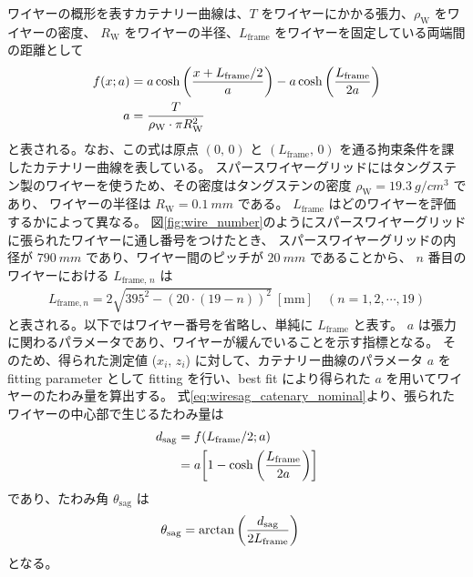 \documentclass[../../main.tex]{subfiles}
\begin{document}
ワイヤーの概形を表すカテナリー曲線は、$T$ をワイヤーにかかる張力、$\rho_{\mathrm{W}}$ をワイヤーの密度、
$R_{\mathrm{W}}$ をワイヤーの半径、$L_{\mathrm{frame}}$ をワイヤーを固定している両端間の距離として
\begin{align}
    \label{eq:wiresag_catenary_nominal}
    f(x;a) &= a\cosh\qty(\dfrac{x+L_{\mathrm{frame}}/2}{a}) - a\cosh\qty(\dfrac{L_{\mathrm{frame}}}{2a}) \\
    a &= \dfrac{T}{\rho_{\mathrm{W}}\cdot\pi R_{\mathrm{W}}^2}
\end{align}
と表される。なお、この式は原点 $(0,\,0)$ と $(L_{\mathrm{frame}},\,0)$ を通る拘束条件を課したカテナリー曲線を表している。
スパースワイヤーグリッドにはタングステン製のワイヤーを使うため、その密度はタングステンの密度 $\rho_{\mathrm{W}}=\SI{19.3}{g/cm^3}$ であり、
ワイヤーの半径は $R_{\mathrm{W}}=\SI{0.1}{mm}$ である。
$L_{\mathrm{frame}}$ はどのワイヤーを評価するかによって異なる。
図\ref{fig:wire_number}のようにスパースワイヤーグリッドに張られたワイヤーに通し番号をつけたとき、
スパースワイヤーグリッドの内径が $\SI{790}{mm}$ であり、ワイヤー間のピッチが $\SI{20}{mm}$ であることから、
$n$ 番目のワイヤーにおける $L_{\mathrm{frame},\,n}$ は
\begin{align}
    \label{eq:wiresag_frame_length}
    L_{\mathrm{frame}, n} = 2\sqrt{395^2-(20\cdot(19-n))^2}\ [\mathrm{mm}] \quad (n=1,2,\cdots,19)
\end{align}
と表される。以下ではワイヤー番号を省略し、単純に $L_{\mathrm{frame}}$ と表す。
$a$ は張力に関わるパラメータであり、ワイヤーが緩んでいることを示す指標となる。
そのため、得られた測定値 ($x_{i},\,z_{i}$) に対して、カテナリー曲線のパラメータ $a$ を fitting parameter として
fitting を行い、best fit により得られた $a$ を用いてワイヤーのたわみ量を算出する。
式\eqref{eq:wiresag_catenary_nominal}より、張られたワイヤーの中心部で生じるたわみ量は
\begin{align}
    d_{\mathrm{sag}} &= f(L_{\mathrm{frame}}/2;a) \\
    \label{eq:wiresag_sag}
                     &= a\qty[1-\cosh\qty(\dfrac{L_{\mathrm{frame}}}{2a})]
\end{align}
であり、たわみ角 $\theta_{\mathrm{sag}}$ は
\begin{align}
    \label{eq:wiresag_sag_angle}
    \theta_{\mathrm{sag}} &= \arctan\qty(\dfrac{d_{\mathrm{sag}}}{2L_{\mathrm{frame}}})
\end{align}
となる。
\end{document}
